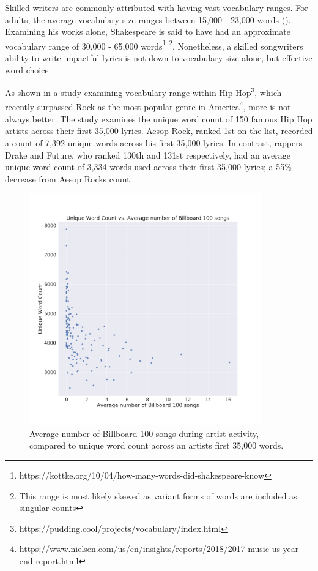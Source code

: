 \noindent
\newline
Skilled writers are commonly attributed with having vast vocabulary ranges. For adults, the average vocabulary size ranges between 15,000 - 23,000 words (\cite{McCrum2011}). Examining his works alone, Shakespeare is said to have had an approximate vocabulary range of 30,000 - 65,000 words\footnote{https://kottke.org/10/04/how-many-words-did-shakespeare-know} \footnote{This range is most likely skewed as variant forms of words are included as singular counts}. Nonetheless, a skilled songwriters ability to write impactful lyrics is not down to vocabulary size alone, but effective word choice.
 
\noindent
\newline
As shown in a study examining vocabulary range within Hip Hop\footnote{https://pudding.cool/projects/vocabulary/index.html}, which recently surpassed Rock as the most popular genre in America\footnote{https://www.nielsen.com/us/en/insights/reports/2018/2017-music-us-year-end-report.html}, more is not always better. The study examines the unique word count of 150 famous Hip Hop artists across their first 35,000 lyrics. Aesop Rock, ranked 1st on the list, recorded a count of 7,392 unique words across his first 35,000 lyrics. In contrast, rappers Drake and Future, who ranked 130th and 131st respectively, had an average unique word count of 3,334 words used across their first 35,000 lyrics; a 55\% decrease from Aesop Rocks count. 
\begin{figure}[h]	
	\includegraphics[width=10cm, height=10cm]{./figures/fig1}
	\centering
	\caption[Average Number of Billboard 100 songs vs Unique Word Count]{Average number of Billboard 100 songs during artist activity, compared to unique word count across an artists first 35,000 words.}
	\label{fig:fig1}
\end{figure}

